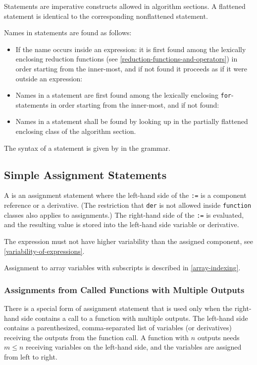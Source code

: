 Statements are imperative constructs allowed in algorithm sections.
A flattened statement is identical to the corresponding nonflattened statement.

Names in statements are found as follows:
\begin{itemize}
\item
  If the name occurs inside an expression: it is first found among the lexically enclosing reduction functions (see \cref{reduction-functions-and-operators}) in order starting from the inner-most, and if not found it proceeds as if it were outside an expression:
\item
  Names in a statement are first found among the lexically enclosing \lstinline!for!-statements in order starting from the inner-most, and if not found:
\item
  Names in a statement shall be found by looking up in the partially flattened enclosing class of the algorithm section.
\end{itemize}

The syntax of a statement is given by  in the grammar.


\subsection{Simple Assignment Statements}\label{simple-assignment-statements}

A  is an assignment statement where the left-hand side of the \lstinline!:=! is a component reference or a derivative.
(The restriction that \lstinline!der! is not allowed inside \lstinline!function! classes also applies to assignments.)
The right-hand side of the \lstinline!:=! is evaluated, and the resulting value is stored into the left-hand side variable or derivative.

The expression must not have higher variability than the assigned component, see \cref{variability-of-expressions}.

Assignment to array variables with subscripts is described in \cref{array-indexing}.


\subsubsection{Assignments from Called Functions with Multiple Outputs}\label{assignments-from-called-functions-with-multiple-results}

There is a special form of assignment statement that is used only when the right-hand side contains a call to a function with multiple outputs.
The left-hand side contains a parenthesized, comma-separated list of variables (or derivatives) receiving the outputs from the function call.
A function with $n$ outputs needs $m \leq n$ receiving variables on the left-hand side, and the variables are assigned from left to right.

